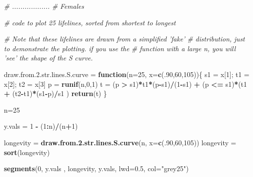 \documentclass[]{book}
\newenvironment{Shaded}{\begin{snugshade}}{\end{snugshade}}
\newcommand{\CommentTok}[1]{\textcolor[rgb]{0.56,0.35,0.01}{\textit{#1}}}
\newcommand{\ControlFlowTok}[1]{\textcolor[rgb]{0.13,0.29,0.53}{\textbf{#1}}}
\newcommand{\DataTypeTok}[1]{\textcolor[rgb]{0.13,0.29,0.53}{#1}}
\newcommand{\DecValTok}[1]{\textcolor[rgb]{0.00,0.00,0.81}{#1}}
\newcommand{\FloatTok}[1]{\textcolor[rgb]{0.00,0.00,0.81}{#1}}
\newcommand{\KeywordTok}[1]{\textcolor[rgb]{0.13,0.29,0.53}{\textbf{#1}}}
\newcommand{\NormalTok}[1]{#1}
\newcommand{\OperatorTok}[1]{\textcolor[rgb]{0.81,0.36,0.00}{\textbf{#1}}}
\newcommand{\StringTok}[1]{\textcolor[rgb]{0.31,0.60,0.02}{#1}}
\begin{document}
\begin{Shaded}
\begin{Highlighting}[]
\CommentTok{# ..................   # Females}


\CommentTok{# code to plot 25 lifelines, sorted from shortest to longest }

\CommentTok{# Note that these lifelines are drawn from a simplified 'fake' }
\CommentTok{#  distribution, just to demonstrate the plotting. if you use the}
\CommentTok{# function with a large n, you will 'see' the shape of the S curve.}

\NormalTok{draw.from.}\FloatTok{2.}\NormalTok{str.lines.S.curve =}\StringTok{ }
\StringTok{   }\ControlFlowTok{function}\NormalTok{(}\DataTypeTok{n=}\DecValTok{25}\NormalTok{, }\DataTypeTok{x=}\KeywordTok{c}\NormalTok{(.}\DecValTok{90}\NormalTok{,}\DecValTok{60}\NormalTok{,}\DecValTok{105}\NormalTok{))\{}
\NormalTok{  s1 =}\StringTok{ }\NormalTok{x[}\DecValTok{1}\NormalTok{]; t1 =}\StringTok{ }\NormalTok{x[}\DecValTok{2}\NormalTok{]; t2 =}\StringTok{ }\NormalTok{x[}\DecValTok{3}\NormalTok{]}
\NormalTok{  p =}\StringTok{ }\KeywordTok{runif}\NormalTok{(n,}\DecValTok{0}\NormalTok{,}\DecValTok{1}\NormalTok{)}
\NormalTok{  t =}\StringTok{ }\NormalTok{(p }\OperatorTok{>}\StringTok{  }\NormalTok{s1)}\OperatorTok{*}\NormalTok{t1}\OperatorTok{*}\NormalTok{(p}\OperatorTok{-}\NormalTok{s1)}\OperatorTok{/}\NormalTok{(}\DecValTok{1}\OperatorTok{-}\NormalTok{s1) }\OperatorTok{+}\StringTok{ }
\StringTok{      }\NormalTok{(p }\OperatorTok{<=}\StringTok{ }\NormalTok{s1)}\OperatorTok{*}\NormalTok{(t1 }\OperatorTok{+}\StringTok{ }\NormalTok{(t2}\OperatorTok{-}\NormalTok{t1)}\OperatorTok{*}\NormalTok{(s1}\OperatorTok{-}\NormalTok{p)}\OperatorTok{/}\NormalTok{s1 )}
  \KeywordTok{return}\NormalTok{(t)}
\NormalTok{\}}

\NormalTok{n=}\DecValTok{25}

\NormalTok{y.vals  =}\StringTok{  }\DecValTok{1} \OperatorTok{-}\StringTok{ }\NormalTok{(}\DecValTok{1}\OperatorTok{:}\NormalTok{n)}\OperatorTok{/}\NormalTok{(n}\OperatorTok{+}\DecValTok{1}\NormalTok{)}

\NormalTok{longevity =}\StringTok{ }\KeywordTok{draw.from.2.str.lines.S.curve}\NormalTok{(n, }
                            \DataTypeTok{x=}\KeywordTok{c}\NormalTok{(.}\DecValTok{90}\NormalTok{,}\DecValTok{60}\NormalTok{,}\DecValTok{105}\NormalTok{))}
\NormalTok{longevity =}\StringTok{ }\KeywordTok{sort}\NormalTok{(longevity)}

\KeywordTok{segments}\NormalTok{(}\DecValTok{0}\NormalTok{, y.vals , longevity, y.vals, }\DataTypeTok{lwd=}\FloatTok{0.5}\NormalTok{, }\DataTypeTok{col=}\StringTok{"grey25"}\NormalTok{)}
\end{Highlighting}
\end{Shaded}
\end{document}
